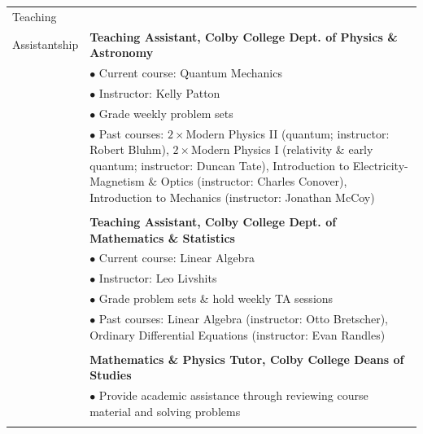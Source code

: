 \documentclass[10pt]{article}
\begin{document}
\begin{longtable}{ l p{14.5cm}   }
  
   						
   
     					
     					

     					   		   					 
     					 
  \large{Teaching}   	& \\ 
  \large{Assistantship} & \textbf{Teaching Assistant, Colby College Dept. of Physics \& Astronomy} \\
  						& $\bullet$ Current course: Quantum Mechanics\\
    					& $\bullet$ Instructor: Kelly Patton \\
    					& $\bullet$ Grade weekly problem sets \\ 
     					& $\bullet$ Past courses: $2\times$Modern Physics II (quantum; instructor: Robert Bluhm), $2\times$Modern Physics I (relativity \& early quantum; instructor: Duncan Tate), Introduction to Electricity-Magnetism \& Optics (instructor: Charles Conover), Introduction to Mechanics (instructor: Jonathan McCoy)\\
     					& \\
     					 
     					& \textbf{Teaching Assistant, Colby College Dept. of Mathematics \& Statistics} \\
     					& $\bullet$ Current course: Linear Algebra\\
     					& $\bullet$ Instructor: Leo Livshits \\
     					& $\bullet$ Grade problem sets \& hold weekly TA sessions \\ %
     					& $\bullet$ Past courses: Linear Algebra (instructor: Otto Bretscher), Ordinary Differential Equations (instructor: Evan Randles)\\
     					& \\
     					 
     					& \textbf{Mathematics \& Physics Tutor, Colby College Deans of Studies} \\
     					&  $\bullet$ Provide academic assistance through reviewing course material and solving problems \\
     					& \\
     					 
     					 
     					 
  
     				 	 

\end{longtable}
\end{document}

